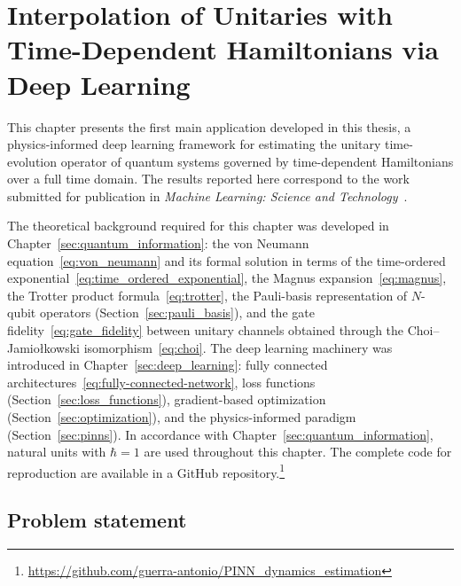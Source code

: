 \chapter{Interpolation of Unitaries with Time-Dependent Hamiltonians via Deep Learning}
\label{ch:results-pinn-unitaries}

This chapter presents the first main application developed in this thesis, a physics-informed deep learning framework for estimating the unitary time-evolution operator of quantum systems governed by time-dependent Hamiltonians over a full time domain. The results reported here correspond to the work submitted for publication in \textit{Machine Learning: Science and Technology}~\cite{guerra2026interpolation}.

The theoretical background required for this chapter was developed in Chapter~\ref{sec:quantum_information}: the von Neumann equation~\eqref{eq:von_neumann} and its formal solution in terms of the time-ordered exponential~\eqref{eq:time_ordered_exponential}, the Magnus expansion~\eqref{eq:magnus}, the Trotter product formula~\eqref{eq:trotter}, the Pauli-basis representation of $N$-qubit operators (Section~\ref{sec:pauli_basis}), and the gate fidelity~\eqref{eq:gate_fidelity} between unitary channels obtained through the Choi--Jamio\l{}kowski isomorphism~\eqref{eq:choi}. The deep learning machinery was introduced in Chapter~\ref{sec:deep_learning}: fully connected architectures~\eqref{eq:fully-connected-network}, loss functions (Section~\ref{sec:loss_functions}), gradient-based optimization (Section~\ref{sec:optimization}), and the physics-informed paradigm (Section~\ref{sec:pinns}). In accordance with Chapter~\ref{sec:quantum_information}, natural units with $\hbar = 1$ are used throughout this chapter. The complete code for reproduction are available in a GitHub repository.\footnote{\url{https://github.com/guerra-antonio/PINN_dynamics_estimation}}

\section{Problem statement}
\label{sec:res-problem}

